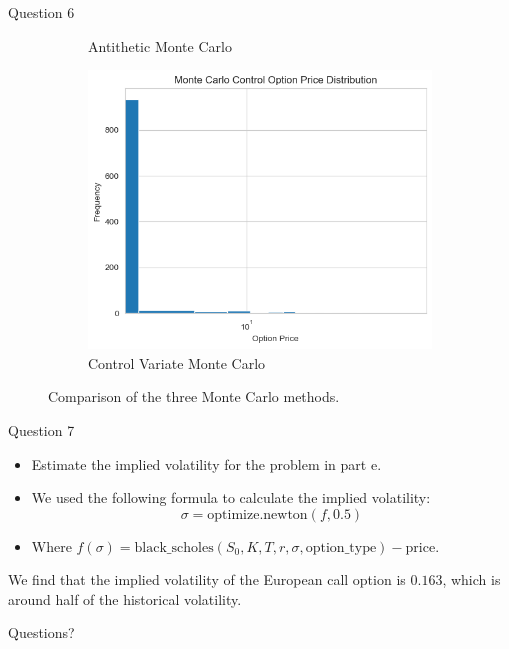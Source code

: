 \documentclass[compress,12pt]{beamer}
\begin{document}
\begin{frame}{Question 6}
\begin{figure}
\begin{subfigure}{0.4\textwidth}
                  \caption{Antithetic Monte Carlo}
            \end{subfigure}
            \begin{subfigure}{0.4\textwidth}
                  \centering
                  \includegraphics[scale=0.3]{./imgs/mccontrol.png}
                  \caption{Control Variate Monte Carlo}
            \end{subfigure}
            \caption{Comparison of the three Monte Carlo methods.}
      \end{figure}
      
\end{frame}

\begin{frame}{Question 7}

      \begin{itemize}
            \item Estimate the implied volatility for the problem in part e.
            \item We used the following formula to calculate the implied volatility:
            \begin{equation*}
                  \sigma = \text{optimize.newton}(f, 0.5)
            \end{equation*}
            \item Where $f(\sigma) = \text{black\_scholes}(S_0, K, T, r, \sigma, \text{option\_type}) - \text{price}$.
      \end{itemize}

      \begin{tcolorbox}
            We find that the implied volatility of the European call option is $\boxed{0.163}$,
            which is around half of the historical volatility.
      \end{tcolorbox}
\end{frame}

\End
\begin{frame}
      \centering
      Questions?
\end{frame}
\end{document}
